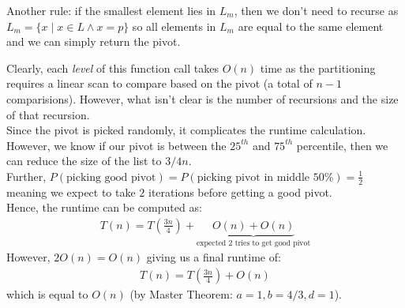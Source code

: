 \documentclass[14pt]{extarticle}
\begin{document}
    Another rule: if the smallest element lies in $L_m$, then we don't need
    to recurse as $L_m = \{x\mid x \in L \land x = p\}$ so all elements 
    in $L_m$ are equal to the same element and we can simply return the pivot.

    \begin{algorithm}[H]
    \end{algorithm}

    Clearly, each \textit{level} of this function call takes $O(n)$ time
    as the partitioning requires a linear scan to compare based on the pivot
    (a total of $n - 1$ comparisions). However, what isn't clear is the number
    of recursions and the size of that recursion.\\

    Since the pivot is picked randomly, it complicates the runtime calculation.
    However, we know if our pivot is between the $25^{th}$ and $75^{th}$ 
    percentile, then we can reduce the size of the list to $3/4 n$.\\

    Further, $P\left(\text{picking good pivot}\right) = P\left(
    \text{picking pivot in middle $50\%$}\right) = \frac{1}{2}$ meaning we
    expect to take $2$ iterations before getting a good pivot.\\

    Hence, the runtime can be computed as:
    \begin{align*}
        T(n) = T\left(\frac{3n}{4}\right) 
            + \underbrace{O(n) + O(n)}_{\text{expected 2 tries to get good pivot}}
    \end{align*}
    However, $2O(n) = O(n)$ giving us a final runtime of:
    \begin{align*}
        T(n) = T\left(\frac{3n}{4}\right) + O(n)
    \end{align*}
    which is equal to $O(n)$ (by Master Theorem: $a = 1, b = 4/3, d = 1$).
\end{document}
